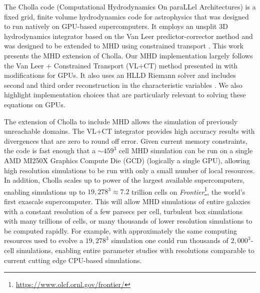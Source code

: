 \documentclass[modern]{aastex631}
\begin{document}
The Cholla code (Computational Hydrodynamics On paraLLel Architectures) \citep{schneider_2015} is a fixed grid, finite volume hydrodynamics code for astrophysics that was designed to run natively on GPU-based supercomputers. It employs an unsplit 3D hydrodynamics integrator based on the Van Leer predictor-corrector method \citep{falle_1991, van_leer_2006} and was designed to be extended to MHD using constrained transport \citep{evans_1988}. This work presents the MHD extension of Cholla. Our MHD implementation largely follows the Van Leer + Constrained Transport (VL+CT) method presented in \cite{stone_2009} with modifications for GPUs. It also uses an HLLD Riemann solver \citep{hlld_2005} and includes second \citep{stone_2009} and third \citep{felker_2018} order reconstruction in the characteristic variables \citep{stone_athena_2008}. We also highlight implementation choices that are particularly relevant to solving these equations on GPUs.

The extension of Cholla to include MHD allows the simulation of previously unreachable domains. The VL+CT integrator provides high accuracy results with divergences that are zero to round off error. Given current memory constraints, the code is fast enough that a $\sim459^3$ cell MHD simulation can be run on a single AMD MI250X Graphics Compute Die (GCD) (logically a single GPU), allowing high resolution simulations to be run with only a small number of local resources. In addition, Cholla scales up to power of the largest available supercomputers, enabling simulations up to $19,278^3 \approx 7.2$ trillion cells on \textit{Frontier}\footnote{\url{https://www.olcf.ornl.gov/frontier/}}, the world's first exascale supercomputer. This will allow MHD simulations of entire galaxies with a constant resolution of a few parsecs per cell, turbulent box simulations with many trillions of cells, or many thousands of lower resolution simulations to be computed rapidly. For example, with approximately the same computing resources used to evolve a $19,278^3$ simulation one could run thousands of $2,000^3$-cell simulations, enabling entire parameter studies with resolutions comparable to current cutting edge CPU-based simulations.
\end{document}
